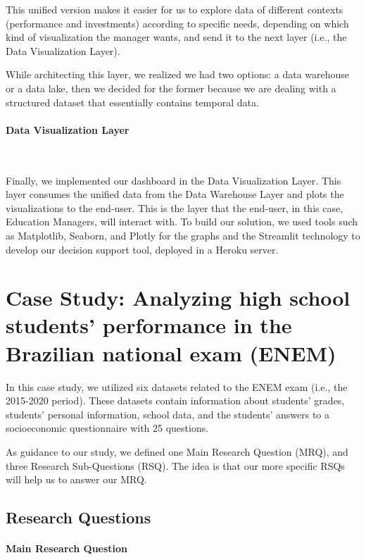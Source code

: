 \documentclass[12pt]{article}
\begin{document}
This unified version makes it easier for us to explore data of different contexts (performance and investments) according to specific needs, depending on which kind of visualization the manager wants, and send it to the next layer (i.e., the Data Visualization Layer).  

While architecting this layer, we realized we had two options: a data warehouse or a data lake, then we decided for the former because we are dealing with a structured dataset that essentially contains temporal data.

\paragraph{Data Visualization Layer}\

Finally, we implemented our dashboard in the Data Visualization Layer. This layer consumes the unified data from the Data Warehouse Layer and plots the visualizations to the end-user. This is the layer that the end-user, in this case, Education Managers, will interact with. To build our solution, we used tools such as Matplotlib, Seaborn, and Plotly for the graphs and the Streamlit technology to develop our decision support tool, deployed in a Heroku server.

\section{Case Study: Analyzing high school students' performance in the Brazilian national exam (ENEM)}

In this case study, we utilized six datasets related to the ENEM exam (i.e., the 2015-2020 period). These datasets contain information about students' grades, students' personal information, school data, and the students' answers to a socioeconomic questionnaire with 25 questions.

As guidance to our study, we defined one Main Research Question (MRQ), and three Research Sub-Questions (RSQ). The idea is that our more specific RSQs will help us to answer our MRQ.

\subsection{Research Questions}

\paragraph{Main Research Question}\
\end{document}
